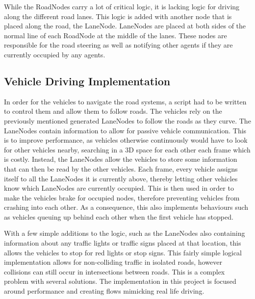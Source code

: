 

    While the RoadNodes carry a lot of critical logic, it is lacking logic for driving along the different road lanes. This logic is added with another node that is placed along the road, the LaneNode. LaneNodes are placed at both sides of the normal line of each RoadNode at the middle of the lanes. These nodes are responsible for the road steering as well as notifying other agents if they are currently occupied by any agents.



\subsection{Vehicle Driving Implementation}
    In order for the vehicles to navigate the road systems, a script had to be written to control them and allow them to follow roads. The vehicles rely on the previously mentioned generated LaneNodes to follow the roads as they curve. The LaneNodes contain information to allow for passive vehicle communication. This is to improve performance, as vehicles otherwise continuously would have to look for other vehicles nearby, searching in a 3D space for each other each frame which is costly. Instead, the LaneNodes allow the vehicles to store some information that can then be read by the other vehicles. Each frame, every vehicle assigns itself to all the LaneNodes it is currently above, thereby letting other vehicles know which LaneNodes are currently occupied. This is then used in order to make the vehicles brake for occupied nodes, therefore preventing vehicles from crashing into each other. As a consequence, this also implements behaviours such as vehicles queuing up behind each other when the first vehicle has stopped.

    With a few simple additions to the logic, such as the LaneNodes also containing information about any traffic lights or traffic signs placed at that location, this allows the vehicles to stop for red lights or stop signs. This fairly simple logical implementation allows for non-colliding traffic in isolated roads, however collisions can still occur in intersections between roads. This is a complex problem with several solutions. The implementation in this project is focused around performance and creating flows mimicking real life driving.

